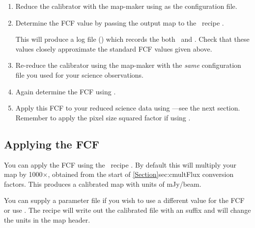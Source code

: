 \begin{enumerate}
\item Reduce the calibrator with the map-maker using
   as the configuration file.

\item Determine the FCF value by passing the output map to the
  \picard\ recipe
  .

\begin{terminalv}
\end{terminalv}

This will produce a log file () which records the
both \fcfb\ and \fcfa. Check that these values closely approximate the
standard FCF values given above.

\item Re-reduce the calibrator using the map-maker with the
  \emph{same} configuration file you used for your science
  observations.

\item Again determine the FCF using .

\item Apply this FCF to your reduced science data using \cmult---see
  the next section. Remember to apply the pixel size squared factor if
  using \fcfa.
\end{enumerate}

\subsection{Applying the FCF}
\label{subsec:ApplyingFCF}

You can apply the FCF using the \picard\ recipe
.
By default this will multiply your map by 1000$\times$\fcfb, obtained
from the start of \cref{Section}{sec:cmult}{Flux conversion
  factors}. This produces a calibrated map with units of mJy/beam.

You can supply a parameter file if you wish to use a different value
for the FCF or use \fcfa. The recipe will write out the calibrated
file with an  suffix and will change the units in the map
header.

\begin{terminalv}
\end{terminalv}

